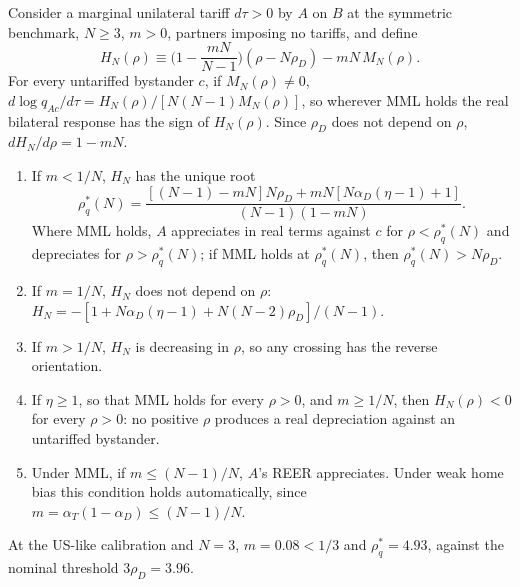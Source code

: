 \begin{proposition}
\label{prop:real}
Consider a marginal unilateral tariff $d\tau>0$ by $A$ on $B$ at the symmetric benchmark, $N\geq3$, $m>0$, partners imposing no tariffs, and define
\begin{equation*}
H_N(\rho)\equiv\Big(1-\frac{mN}{N-1}\Big)(\rho-N\rho_D)-mN\,M_N(\rho).
\end{equation*}
For every untariffed bystander $c$, if $M_N(\rho)\neq0$, $d\log q_{Ac}/d\tau=H_N(\rho)/[N(N-1)M_N(\rho)]$, so wherever MML holds the real bilateral response has the sign of $H_N(\rho)$. Since $\rho_D$ does not depend on $\rho$, $dH_N/d\rho=1-mN$.
\begin{enumerate}[label=(\roman*)]
\item If $m<1/N$, $H_N$ has the unique root
\begin{equation*}
\rho^*_q(N)=\frac{[(N-1)-mN]N\rho_D+mN[N\alpha_D(\eta-1)+1]}{(N-1)(1-mN)}.
\end{equation*}
Where MML holds, $A$ appreciates in real terms against $c$ for $\rho<\rho^*_q(N)$ and depreciates for $\rho>\rho^*_q(N)$; if MML holds at $\rho^*_q(N)$, then $\rho^*_q(N)>N\rho_D$.
\item If $m=1/N$, $H_N$ does not depend on $\rho$: $H_N=-[1+N\alpha_D(\eta-1)+N(N-2)\rho_D]/(N-1)$.
\item If $m>1/N$, $H_N$ is decreasing in $\rho$, so any crossing has the reverse orientation.
\item If $\eta\geq1$, so that MML holds for every $\rho>0$, and $m\geq1/N$, then $H_N(\rho)<0$ for every $\rho>0$: no positive $\rho$ produces a real depreciation against an untariffed bystander.
\item Under MML, if $m\leq(N-1)/N$, $A$'s REER appreciates. Under weak home bias this condition holds automatically, since $m=\alpha_T(1-\alpha_D)\leq(N-1)/N$.
\end{enumerate}
\end{proposition}

At the US-like calibration and $N=3$, $m=0.08<1/3$ and $\rho^*_q=4.93$, against the nominal threshold $3\rho_D=3.96$.

